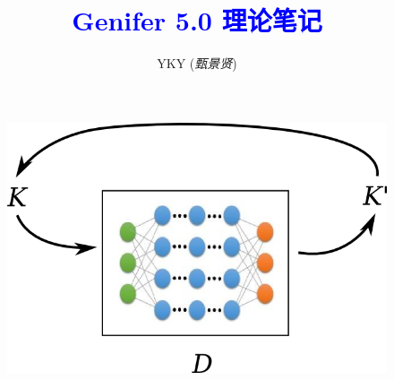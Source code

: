 \documentclass[12pt]{article}
\title{\textcolor{blue}{Genifer 5.0 理论笔记}}
\author{YKY (\textit{甄景贤})}
\newcommand{\tab}{\hspace*{1cm}}
\begin{document}

{\let\newpage\relax\maketitle}

\maketitle
\setlength{\parindent}{0em}
\setlength{\parskip}{1.5ex plus0.5ex minus1.2ex}

\section{}

\begin{figure}[H]
\centering
\includegraphics[scale=0.75]{genifer-model-0.png}
\end{figure}
\end{document}
